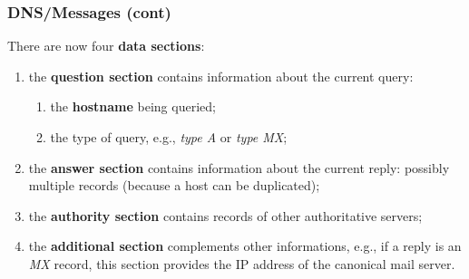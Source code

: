 %
\begin{frame}
\frametitle{DNS/Messages (cont)}

There are now four \textbf{data sections}:

\begin{enumerate}

  \item the \textbf{question section} contains information about the
  current query:
  \begin{enumerate}

    \item the \textbf{hostname} being queried;

    \item the type of query, e.g., \emph{type A} or \emph{type MX};

  \end{enumerate}

  \item the \textbf{answer section} contains information about the
    current reply: possibly multiple records (because a host can be
    duplicated);

  \item the \textbf{authority section} contains records of other
    authoritative servers;

  \item the \textbf{additional section} complements other
    informations, e.g., if a reply is an \emph{MX} record, this section
    provides the IP address of the canonical mail server.

\end{enumerate}

\end{frame}
